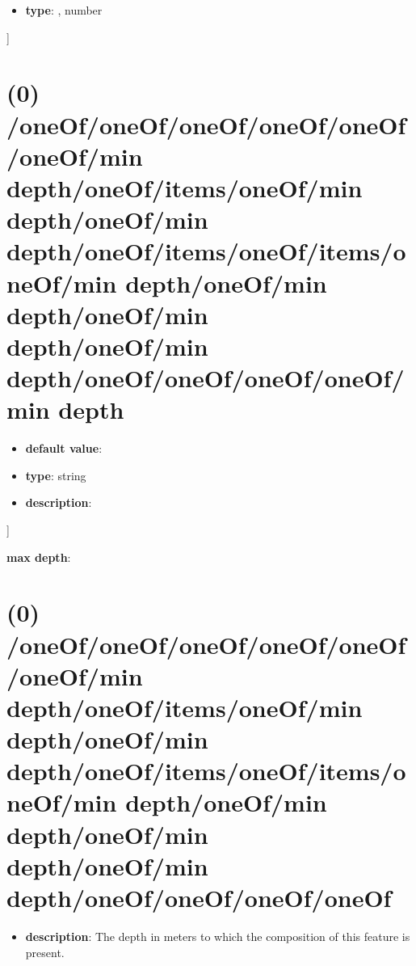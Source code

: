 \begin{itemize}[leftmargin=5em]\item {\bf type}: , number\end{itemize}]\section{(0) /oneOf/oneOf/oneOf/oneOf/oneOf/oneOf/min depth/oneOf/items/oneOf/min depth/oneOf/min depth/oneOf/items/oneOf/items/oneOf/min depth/oneOf/min depth/oneOf/min depth/oneOf/min depth/oneOf/oneOf/oneOf/oneOf/min depth}
\begin{itemize}[leftmargin=0em]\item {\bf default value}: 
\item {\bf type}: string
\item {\bf description}: 
\end{itemize}]\item {\bf max depth}: \section{(0) /oneOf/oneOf/oneOf/oneOf/oneOf/oneOf/min depth/oneOf/items/oneOf/min depth/oneOf/min depth/oneOf/items/oneOf/items/oneOf/min depth/oneOf/min depth/oneOf/min depth/oneOf/min depth/oneOf/oneOf/oneOf/oneOf}
\begin{itemize}[leftmargin=0em]\item {\bf description}: The depth in meters to which the composition of this feature is present.
\end{itemize}
